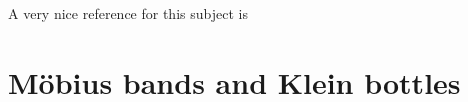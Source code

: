 \documentclass[a4paper]{report}
\theoremstyle{definition}
\begin{document}
  A very nice reference for this subject is \autocite[\S\S 1.2-1.3]{coxeterPoly}


  \section{M\"obius bands and Klein bottles}

  \restoregeometry

  \clearpage
  \printbibliography[title={Bibliography and further reading}]

  \clearpage
  \printindex
\end{document}
